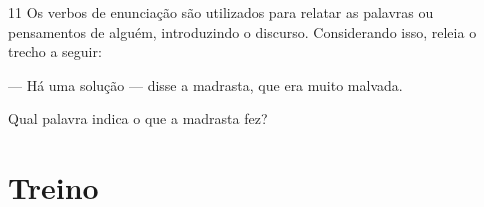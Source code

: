 \num{11} Os verbos de enunciação são utilizados para relatar as palavras ou pensamentos de alguém, introduzindo o discurso. Considerando isso, releia o trecho a seguir:

\begin{myquote}
--- Há uma solução --- disse a madrasta, que era muito malvada.
\end{myquote}


Qual palavra indica o que a madrasta fez?


\pagebreak
\section*{Treino}

